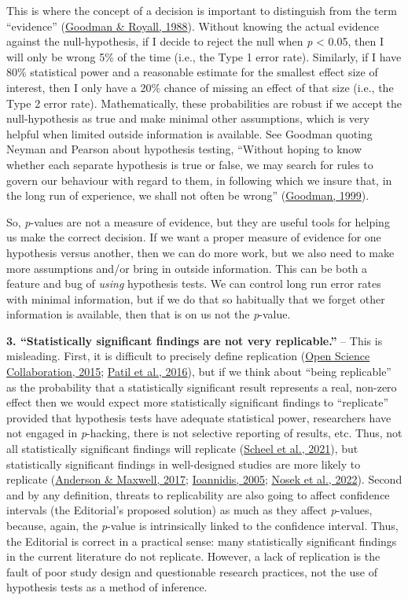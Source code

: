 \documentclass[]{cik}%
\begin{document}
This is where the concept of a decision is important to distinguish from
the term ``evidence'' (\protect\hyperlink{ref-9}{Goodman \& Royall,
1988}). Without knowing the actual evidence against the null-hypothesis,
if I decide to reject the null when \emph{p} \textless{} 0.05, then I
will only be wrong 5\% of the time (i.e., the Type 1 error rate).
Similarly, if I have 80\% statistical power and a reasonable estimate
for the smallest effect size of interest, then I only have a 20\% chance
of missing an effect of that size (i.e., the Type 2 error rate).
Mathematically, these probabilities are robust if we accept the
null-hypothesis as true and make minimal other assumptions, which is
very helpful when limited outside information is available. See Goodman
quoting Neyman and Pearson about hypothesis testing, ``Without hoping to
know whether each separate hypothesis is true or false, we may search
for rules to govern our behaviour with regard to them, in following
which we insure that, in the long run of experience, we shall not often
be wrong'' (\protect\hyperlink{ref-10}{Goodman, 1999}).

So, \emph{p}-values are not a measure of evidence, but they are useful
tools for helping us make the correct decision. If we want a proper
measure of evidence for one hypothesis versus another, then we can do
more work, but we also need to make more assumptions and/or bring in
outside information. This can be both a feature and bug of \emph{using}
hypothesis tests. We can control long run error rates with minimal
information, but if we do that so habitually that we forget other
information is available, then that is on us not the \emph{p}-value.

\textbf{3. ``Statistically significant findings are not very
replicable.''} -- This is misleading. First, it is difficult to
precisely define replication (\protect\hyperlink{ref-11}{Open Science
Collaboration, 2015}; \protect\hyperlink{ref-12}{Patil et al., 2016}),
but if we think about ``being replicable'' as the probability that a
statistically significant result represents a real, non-zero effect then
we would expect more statistically significant findings to ``replicate''
provided that hypothesis tests have adequate statistical power,
researchers have not engaged in \emph{p}-hacking, there is not selective
reporting of results, etc. Thus, not all statistically significant
findings will replicate (\protect\hyperlink{ref-13}{Scheel et al.,
2021}), but statistically significant findings in well-designed studies
are more likely to replicate (\protect\hyperlink{ref-15}{Anderson \&
Maxwell, 2017}; \protect\hyperlink{ref-14}{Ioannidis, 2005};
\protect\hyperlink{ref-16}{Nosek et al., 2022}). Second and by any
definition, threats to replicability are also going to affect confidence
intervals (the Editorial's proposed solution) as much as they affect
\emph{p}-values, because, again, the \emph{p}-value is intrinsically
linked to the confidence interval. Thus, the Editorial is correct in a
practical sense: many statistically significant findings in the current
literature do not replicate. However, a lack of replication is the fault
of poor study design and questionable research practices, not the use of
hypothesis tests as a method of inference.
\end{document}
